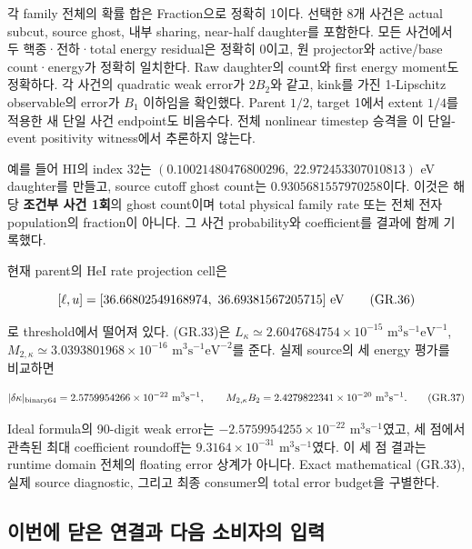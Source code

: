 각 family 전체의 확률 합은 Fraction으로 정확히 1이다. 선택한 8개 사건은 actual subcut, source ghost, 내부 sharing, near-half daughter를 포함한다. 모든 사건에서 두 핵종·전하·total energy residual은 정확히 0이고, 원 projector와 active/base count·energy가 정확히 일치한다. Raw daughter의 count와 first energy moment도 정확하다. 각 사건의 quadratic weak error가 \(2B_2\)와 같고, kink를 가진 1-Lipschitz observable의 error가 \(B_1\) 이하임을 확인했다. Parent \(1/2\), target 1에서 extent \(1/4\)를 적용한 새 단일 사건 endpoint도 비음수다. 전체 nonlinear timestep 승격을 이 단일-event positivity witness에서 추론하지 않는다.

예를 들어 HI의 index 32는 \((0.10021480476800296,\ 22.972453307010813)\) eV daughter를 만들고, source cutoff ghost count는 \(0.9305681557970258\)이다. 이것은 해당 \textbf{조건부 사건 1회}의 ghost count이며 total physical family rate 또는 전체 전자 population의 fraction이 아니다. 그 사건 probability와 coefficient를 결과에 함께 기록했다.

현재 parent의 HeI rate projection cell은

\[
 [\ell,u]=[36.66802549168974,\ 36.69381567205715]\ {\rm eV}
\tag{GR.36}
\]

로 threshold에서 떨어져 있다. (GR.33)은 \(L_\kappa\simeq2.6047684754\times10^{-15}\) \(\mathrm{m^3s^{-1}eV^{-1}}\), \(M_{2,\kappa}\simeq3.0393801968\times10^{-16}\) \(\mathrm{m^3s^{-1}eV^{-2}}\)를 준다. 실제 source의 세 energy 평가를 비교하면

\[
 |\delta\kappa|_{\rm binary64}
 =2.5759954266\times10^{-22}\ {\rm m^3s^{-1}},\qquad
 M_{2,\kappa}B_2=2.4279822341\times10^{-20}\ {\rm m^3s^{-1}}.
\tag{GR.37}
\]

Ideal formula의 90-digit weak error는 \(-2.5759954255\times10^{-22}\) \(\mathrm{m^3s^{-1}}\)였고, 세 점에서 관측된 최대 coefficient roundoff는 \(9.3164\times10^{-31}\) \(\mathrm{m^3s^{-1}}\)였다. 이 세 점 결과는 runtime domain 전체의 floating error 상계가 아니다. Exact mathematical (GR.33), 실제 source diagnostic, 그리고 최종 consumer의 total error budget을 구별한다.

\hypertarget{uxc774uxbc88uxc5d0-uxb2ebuxc740-uxc5f0uxacb0uxacfc-uxb2e4uxc74c-uxc18cuxbe44uxc790uxc758-uxc785uxb825}{%
\subsection{이번에 닫은 연결과 다음 소비자의 입력}\label{uxc774uxbc88uxc5d0-uxb2ebuxc740-uxc5f0uxacb0uxacfc-uxb2e4uxc74c-uxc18cuxbe44uxc790uxc758-uxc785uxb825}}

